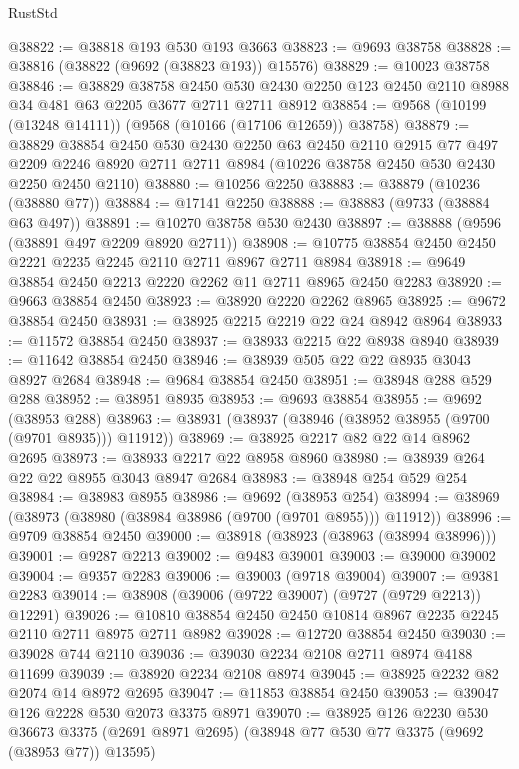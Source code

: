 \begin{lexlean}{RustStd}
\begin{coremodule}
{\begin{coremodule}
{{{{{{{{{{{{{{{{{{{{{{{{{{{{{{{{{{{{{{{{{{{{{{{{{{{{{{{@38822 := @38818 @193 @530 @193 @3663
@38823 := @9693 @38758
@38828 := @38816 (@38822 (@9692 (@38823 @193)) @15576)
@38829 := @10023 @38758
@38846 := @38829
    @38758
    @2450
    @530
    @2430
    @2250
    @123
    @2450
    @2110
    @8988
    @34
    @481
    @63
    @2205
    @3677
    @2711
    @2711
    @8912
@38854 := @9568 (@10199 (@13248 @14111)) (@9568 (@10166 (@17106 @12659)) @38758)
@38879 := @38829
    @38854
    @2450
    @530
    @2430
    @2250
    @63
    @2450
    @2110
    @2915
    @77
    @497
    @2209
    @2246
    @8920
    @2711
    @2711
    @8984
    (@10226 @38758 @2450 @530 @2430 @2250 @2450 @2110)
@38880 := @10256 @2250
@38883 := @38879 (@10236 (@38880 @77))
@38884 := @17141 @2250
@38888 := @38883 (@9733 (@38884 @63 @497))
@38891 := @10270 @38758 @530 @2430
@38897 := @38888 (@9596 (@38891 @497 @2209 @8920 @2711))
@38908 := @10775 @38854 @2450 @2450 @2221 @2235 @2245 @2110 @2711 @8967 @2711 @8984
@38918 := @9649 @38854 @2450 @2213 @2220 @2262 @11 @2711 @8965 @2450 @2283
@38920 := @9663 @38854 @2450
@38923 := @38920 @2220 @2262 @8965
@38925 := @9672 @38854 @2450
@38931 := @38925 @2215 @2219 @22 @24 @8942 @8964
@38933 := @11572 @38854 @2450
@38937 := @38933 @2215 @22 @8938 @8940
@38939 := @11642 @38854 @2450
@38946 := @38939 @505 @22 @22 @8935 @3043 @8927 @2684
@38948 := @9684 @38854 @2450
@38951 := @38948 @288 @529 @288
@38952 := @38951 @8935
@38953 := @9693 @38854
@38955 := @9692 (@38953 @288)
@38963 := @38931 (@38937 (@38946 (@38952 @38955 (@9700 (@9701 @8935))) @11912))
@38969 := @38925 @2217 @82 @22 @14 @8962 @2695
@38973 := @38933 @2217 @22 @8958 @8960
@38980 := @38939 @264 @22 @22 @8955 @3043 @8947 @2684
@38983 := @38948 @254 @529 @254
@38984 := @38983 @8955
@38986 := @9692 (@38953 @254)
@38994 := @38969 (@38973 (@38980 (@38984 @38986 (@9700 (@9701 @8955))) @11912))
@38996 := @9709 @38854 @2450
@39000 := @38918 (@38923 (@38963 (@38994 @38996)))
@39001 := @9287 @2213
@39002 := @9483 @39001
@39003 := @39000 @39002
@39004 := @9357 @2283
@39006 := @39003 (@9718 @39004)
@39007 := @9381 @2283
@39014 := @38908 (@39006 (@9722 @39007) (@9727 (@9729 @2213)) @12291)
@39026 := @10810 @38854 @2450 @2450 @10814 @8967 @2235 @2245 @2110 @2711 @8975 @2711 @8982
@39028 := @12720 @38854 @2450
@39030 := @39028 @744 @2110
@39036 := @39030 @2234 @2108 @2711 @8974 @4188 @11699
@39039 := @38920 @2234 @2108 @8974
@39045 := @38925 @2232 @82 @2074 @14 @8972 @2695
@39047 := @11853 @38854 @2450
@39053 := @39047 @126 @2228 @530 @2073 @3375 @8971
@39070 := @38925
    @126
    @2230
    @530
    @36673
    @3375
    (@2691 @8971 @2695)
    (@38948 @77 @530 @77 @3375 (@9692 (@38953 @77)) @13595)
}}}}}}}}}}}}}}}}}}}}}}}}}}}}}}}}}}}}}}}}}}}}}}}}}}}}}}}
\end{coremodule}}
\end{coremodule}
\end{lexlean}
